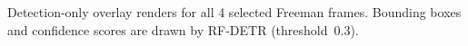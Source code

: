 \caption{Detection-only overlay renders for all 4 selected Freeman frames. Bounding boxes and confidence scores are drawn by RF-DETR (threshold~0.3).}\label{fig:detection-gallery-freeman}

